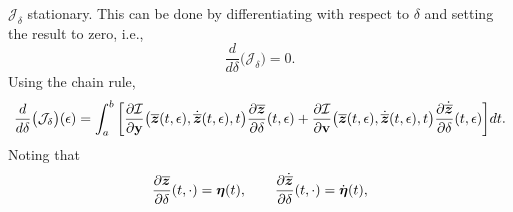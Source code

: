 \documentclass[3p,computermodern,10pt]{elsarticle}
\begin{document}
\begin{appendices}
$\mathcal{J}_{\delta}$ stationary. This can be done by differentiating with
respect to $\delta$ and setting the result to zero, i.e., %
\begin{equation}\label{eq:stationaryOne}
\frac{d}{d\delta} \big( \mathcal{J}_{\delta} \big)=  0.
\end{equation}
Using the chain rule,
$$ 
\frac{d}{d\delta} \big( \mathcal{J}_{\delta} \big)(\epsilon)= 
\int_a^b \bigg[ \frac{\partial \mathcal{I}  }{\partial \mathbf{y} } \big(\overline{\boldsymbol z}(t,\epsilon),\dot{\overline{\boldsymbol z}}(t,\epsilon) ,t\big) \frac{\partial \overline{\boldsymbol z} }{\partial \delta}(t,\epsilon)  + \frac{\partial \mathcal{I}}{\partial \mathbf{{v}} } \big(\overline{\boldsymbol z}(t,\epsilon),\dot{\overline{\boldsymbol z}}(t,\epsilon) ,t \big) \frac{\partial \dot{\overline{\boldsymbol z}}}{\partial \delta} (t,\epsilon)\bigg]dt . $$
Noting that
$$\frac{\partial \overline{\boldsymbol z}}{\partial \delta} (t,\cdot)= \boldsymbol \eta(t), \qquad \frac{\partial \dot{\overline{\boldsymbol z}} }{\partial \delta}(t,\cdot)= \dot{\boldsymbol \eta}(t),$$

\end{appendices}
\end{document}
